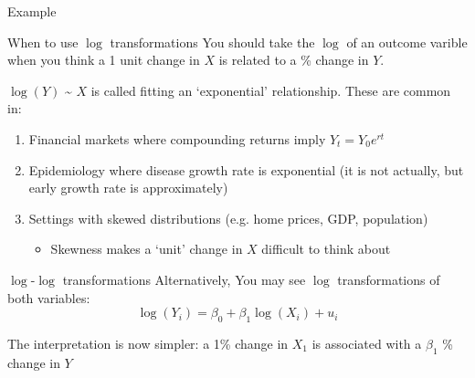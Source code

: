 \documentclass[aspectratio=169,t,11pt,table]{beamer}
\begin{document}


\begin{frame}{Example}

\end{frame}



\begin{frame}{When to use $\log$ transformations}
  You should take the $\log$ of an outcome varible when you think a 1 unit change in $X$ is related to a \% change in $Y$. 

  \pause
  \bigskip
  $\log(Y)$ \textasciitilde{} $X$ is called fitting an `exponential' relationship. These are common in:
  \begin{enumerate}
    \item Financial markets where compounding returns imply $Y_t = Y_0 e^{rt}$
    
    \item Epidemiology where disease growth rate is exponential (it is not actually, but early growth rate is approximately)
    
    \pause
    \item Settings with skewed distributions (e.g. home prices, GDP, population)
    \begin{itemize}
      \item Skewness makes a `unit' change in $X$ difficult to think about
    \end{itemize}
  \end{enumerate}
\end{frame}

\begin{frame}{$\log$-$\log$ transformations}
  Alternatively, You may see $\log$ transformations of both variables:
  $$
    \log(Y_i) = \beta_0 + \beta_1 \log(X_i) + u_i
  $$

  \bigskip
  The interpretation is now simpler: a 1\% change in $X_1$ is associated with a $\beta_1$ \% change in $Y$
\end{frame}
\end{document}
